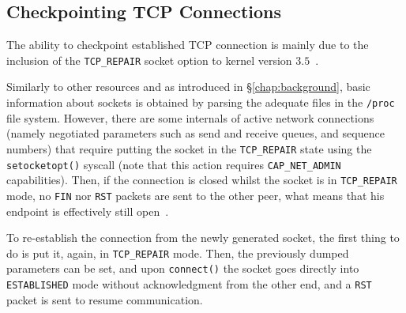 %
%


\subsection{Checkpointing TCP Connections}

The ability to checkpoint established TCP connection is mainly due to the
inclusion of the \texttt{TCP\_REPAIR} socket option to kernel version
$3.5$~\cite{tcp-connection-repair}.

Similarly to other resources and as introduced in \S\ref{chap:background},
basic information about sockets is obtained by parsing the adequate files in
the \texttt{/proc} file system.
However, there are some internals of active network connections (namely
negotiated parameters such as send and receive queues, and sequence numbers)
that require putting the socket in the \texttt{TCP\_REPAIR} state using the
\texttt{setocketopt()} syscall (note that this action requires
\texttt{CAP\_NET\_ADMIN} capabilities).
Then, if the connection is closed whilst the socket is in \texttt{TCP\_REPAIR}
mode, no \texttt{FIN} nor \texttt{RST} packets are sent to the other peer, what
means that his endpoint is effectively still open~\cite{Corbet12}.

To re-establish the connection from the newly generated socket, the first thing
to do is put it, again, in \texttt{TCP\_REPAIR} mode.
Then, the previously dumped parameters can be set, and upon \texttt{connect()}
the socket goes directly into \texttt{ESTABLISHED} mode without acknowledgment
from the other end, and a \texttt{RST} packet is sent to resume communication.

